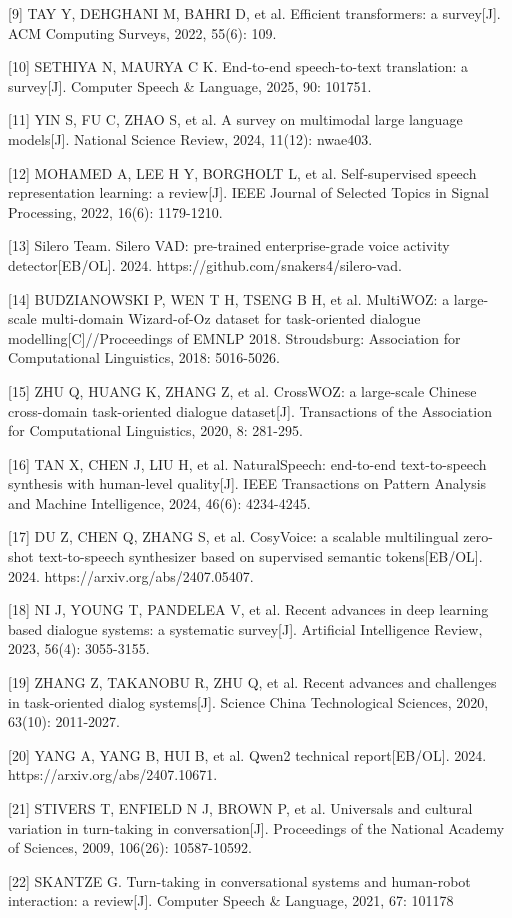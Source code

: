 \documentclass[
]{article}
\begin{document}
{[}9{]} TAY Y, DEHGHANI M, BAHRI D, et al. Efficient transformers: a survey{[}J{]}. ACM Computing Surveys, 2022, 55(6): 109.

{[}10{]} SETHIYA N, MAURYA C K. End-to-end speech-to-text translation: a survey{[}J{]}. Computer Speech \& Language, 2025, 90: 101751.

{[}11{]} YIN S, FU C, ZHAO S, et al. A survey on multimodal large language models{[}J{]}. National Science Review, 2024, 11(12): nwae403.

{[}12{]} MOHAMED A, LEE H Y, BORGHOLT L, et al. Self-supervised speech representation learning: a review{[}J{]}. IEEE Journal of Selected Topics in Signal Processing, 2022, 16(6): 1179-1210.

{[}13{]} Silero Team. Silero VAD: pre-trained enterprise-grade voice activity detector{[}EB/OL{]}. 2024. https://github.com/snakers4/silero-vad.

{[}14{]} BUDZIANOWSKI P, WEN T H, TSENG B H, et al. MultiWOZ: a large-scale multi-domain Wizard-of-Oz dataset for task-oriented dialogue modelling{[}C{]}//Proceedings of EMNLP 2018. Stroudsburg: Association for Computational Linguistics, 2018: 5016-5026.

{[}15{]} ZHU Q, HUANG K, ZHANG Z, et al. CrossWOZ: a large-scale Chinese cross-domain task-oriented dialogue dataset{[}J{]}. Transactions of the Association for Computational Linguistics, 2020, 8: 281-295.

{[}16{]} TAN X, CHEN J, LIU H, et al. NaturalSpeech: end-to-end text-to-speech synthesis with human-level quality{[}J{]}. IEEE Transactions on Pattern Analysis and Machine Intelligence, 2024, 46(6): 4234-4245.

{[}17{]} DU Z, CHEN Q, ZHANG S, et al. CosyVoice: a scalable multilingual zero-shot text-to-speech synthesizer based on supervised semantic tokens{[}EB/OL{]}. 2024. https://arxiv.org/abs/2407.05407.

{[}18{]} NI J, YOUNG T, PANDELEA V, et al. Recent advances in deep learning based dialogue systems: a systematic survey{[}J{]}. Artificial Intelligence Review, 2023, 56(4): 3055-3155.

{[}19{]} ZHANG Z, TAKANOBU R, ZHU Q, et al. Recent advances and challenges in task-oriented dialog systems{[}J{]}. Science China Technological Sciences, 2020, 63(10): 2011-2027.

{[}20{]} YANG A, YANG B, HUI B, et al. Qwen2 technical report{[}EB/OL{]}. 2024. https://arxiv.org/abs/2407.10671.

{[}21{]} STIVERS T, ENFIELD N J, BROWN P, et al. Universals and cultural variation in turn-taking in conversation{[}J{]}. Proceedings of the National Academy of Sciences, 2009, 106(26): 10587-10592.

{[}22{]} SKANTZE G. Turn-taking in conversational systems and human-robot interaction: a review{[}J{]}. Computer Speech \& Language, 2021, 67: 101178
\end{document}
